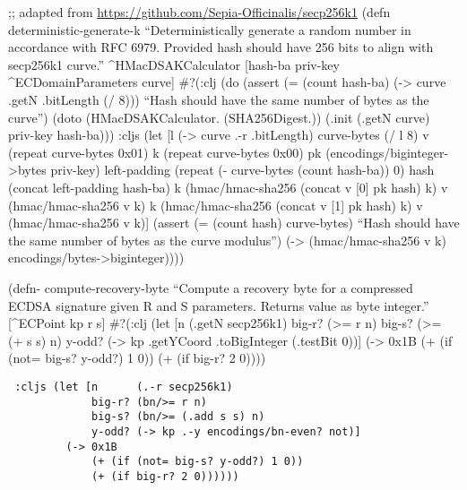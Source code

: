 \documentclass[
]{article}
\begin{document}
;; adapted from \url{https://github.com/Sepia-Officinalis/secp256k1}
(defn deterministic-generate-k ``Deterministically generate a random
number in accordance with RFC 6979. Provided hash should have 256 bits
to align with secp256k1 curve.'' \^{}HMacDSAKCalculator {[}hash-ba
priv-key \^{}ECDomainParameters curve{]} \#?(:clj (do (assert (= (count
hash-ba) (-\textgreater{} curve .getN .bitLength (/ 8))) ``Hash should
have the same number of bytes as the curve'') (doto (HMacDSAKCalculator.
(SHA256Digest.)) (.init (.getN curve) priv-key hash-ba))) :cljs (let
{[}l (-\textgreater{} curve .-r .bitLength) curve-bytes (/ l 8) v
(repeat curve-bytes 0x01) k (repeat curve-bytes 0x00) pk
(encodings/biginteger-\textgreater bytes priv-key) left-padding (repeat
(- curve-bytes (count hash-ba)) 0) hash (concat left-padding hash-ba) k
(hmac/hmac-sha256 (concat v {[}0{]} pk hash) k) v (hmac/hmac-sha256 v k)
k (hmac/hmac-sha256 (concat v {[}1{]} pk hash) k) v (hmac/hmac-sha256 v
k){]} (assert (= (count hash) curve-bytes) ``Hash should have the same
number of bytes as the curve modulus'') (-\textgreater{}
(hmac/hmac-sha256 v k) encodings/bytes-\textgreater biginteger))))

(defn- compute-recovery-byte ``Compute a recovery byte for a compressed
ECDSA signature given R and S parameters. Returns value as byte
integer.'' {[}\^{}ECPoint kp r s{]} \#?(:clj (let {[}n (.getN secp256k1)
big-r? (\textgreater= r n) big-s? (\textgreater= (+ s s) n) y-odd?
(-\textgreater{} kp .getYCoord .toBigInteger (.testBit 0)){]}
(-\textgreater{} 0x1B (+ (if (not= big-s? y-odd?) 1 0)) (+ (if big-r? 2
0))))

\begin{verbatim}
 :cljs (let [n      (.-r secp256k1) 
             big-r? (bn/>= r n) 
             big-s? (bn/>= (.add s s) n) 
             y-odd? (-> kp .-y encodings/bn-even? not)] 
         (-> 0x1B 
             (+ (if (not= big-s? y-odd?) 1 0)) 
             (+ (if big-r? 2 0)))))) 
\end{verbatim}
\end{document}
